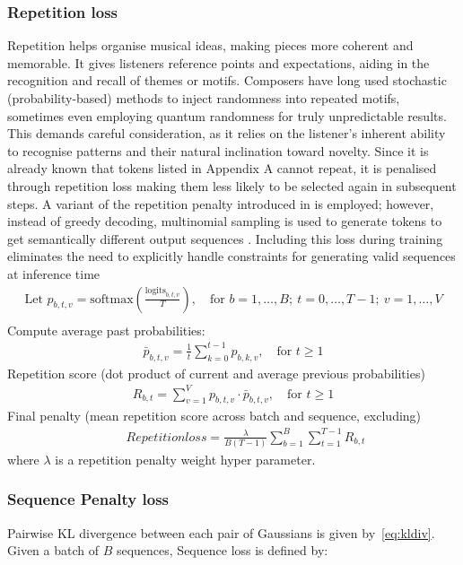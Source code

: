 \documentclass[twoside,11pt]{article}
\begin{document}
\subsubsection{Repetition loss}
Repetition helps organise musical ideas, making pieces more 
coherent and memorable. It gives listeners reference points and expectations, 
aiding in the recognition and recall of themes or motifs. \cite{Hu_2022}
Composers have long used stochastic (probability-based) methods to inject randomness into repeated motifs, 
sometimes even employing quantum randomness for truly unpredictable results. \cite{yamada_grandi_munoz-gil_barbiero_aloy_lewenstein_2021} This demands careful consideration, as it relies on the listener’s inherent ability to recognise patterns and their natural inclination toward novelty. 
Since it is already known that tokens listed in Appendix A cannot repeat, it is penalised through repetition loss making them less likely to be selected again in subsequent steps. 
A variant of the repetition penalty introduced in \cite{reppenalty} is employed; however, instead of greedy decoding, multinomial sampling is used to generate tokens to get semantically different output sequences \cite{song2024}. Including this loss during training eliminates the need to explicitly handle constraints for generating valid sequences at inference time
\begin{align}
\text{Let } p_{b,t,v} = \text{softmax}\left( \frac{\text{logits}_{b,t,v}}{T} \right), \quad \text{for } b = 1,\dots,B;\ t = 0,\dots,T-1;\ v = 1,\dots,V \\[1ex]
\end{align}
Compute average past probabilities:
\begin{align}
\bar{p}_{b,t,v} = \frac{1}{t} \sum_{k=0}^{t-1} p_{b,k,v}, \quad \text{for } t \geq 1
\end{align}
Repetition score (dot product of current and average previous probabilities)
\begin{align}
R_{b,t} = \sum_{v=1}^{V} p_{b,t,v} \cdot \bar{p}_{b,t,v}, \quad \text{for } t \geq 1
\end{align}
Final penalty (mean repetition score across batch and sequence, excluding)
\begin{align}
\qquad Repetition loss = \frac{\lambda}{B(T - 1)} \sum_{b=1}^{B} \sum_{t=1}^{T-1} R_{b,t}
\end{align}
where $\lambda$ is a repetition penalty weight hyper parameter.

\subsubsection{Sequence Penalty loss}
Pairwise KL divergence between each pair of Gaussians is given by~\eqref{eq:kldiv}. 
Given a batch of \( B \) sequences, Sequence loss is defined by:
\end{document}
